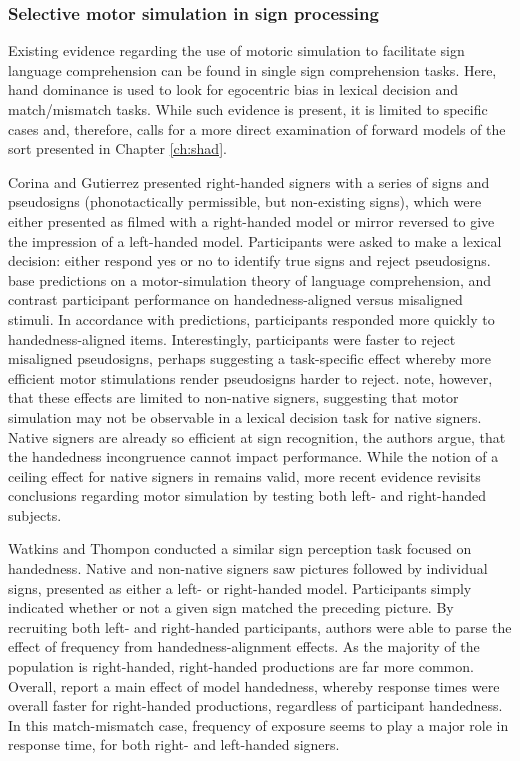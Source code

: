         \subsubsection{Selective motor simulation in sign processing}
            \label{sec:intro_sim_sign}
            Existing evidence regarding the use of motoric simulation to facilitate sign language comprehension can be found in single sign comprehension tasks. Here, hand dominance is used to look for egocentric bias in lexical decision and match/mismatch tasks. While such evidence is present, it is limited to specific cases and, therefore, calls for a more direct examination of forward models of the sort presented in Chapter \ref{ch:shad}. \par
            Corina and Gutierrez \citeyear{corina2016} presented right-handed signers with a series of signs and pseudosigns (phonotactically permissible, but non-existing signs), which were either presented as filmed with a right-handed model or mirror reversed to give the impression of a left-handed model. Participants were asked to make a lexical decision: either respond yes or no to identify true signs and reject pseudosigns.  base predictions on a motor-simulation theory of language comprehension, and contrast participant performance on handedness-aligned versus misaligned stimuli. In accordance with predictions, participants responded more quickly to handedness-aligned items. Interestingly, participants were faster to reject misaligned pseudosigns, perhaps suggesting a task-specific effect whereby more efficient motor stimulations render pseudosigns harder to reject.  note, however, that these effects are limited to non-native signers, suggesting that motor simulation may not be observable in a lexical decision task for native signers. Native signers are already so efficient at sign recognition, the authors argue, that the handedness incongruence cannot impact performance. While the notion of a ceiling effect for native signers in  remains valid, more recent evidence revisits conclusions regarding motor simulation by testing both left- and right-handed subjects. \par
            Watkins and Thompon \citeyear{watkins2017} conducted a similar sign perception task focused on handedness. Native and non-native signers saw pictures followed by individual signs, presented as either a left- or right-handed model. Participants simply indicated whether or not a given sign matched the preceding picture. By recruiting both left- and right-handed participants, authors were able to parse the effect of frequency from handedness-alignment effects. As the majority of the population is right-handed, right-handed productions are far more common. Overall,  report a main effect of model handedness, whereby response times were overall faster for right-handed productions, regardless of participant handedness. In this match-mismatch case, frequency of exposure seems to play a major role in response time, for both right- and left-handed signers. \par

